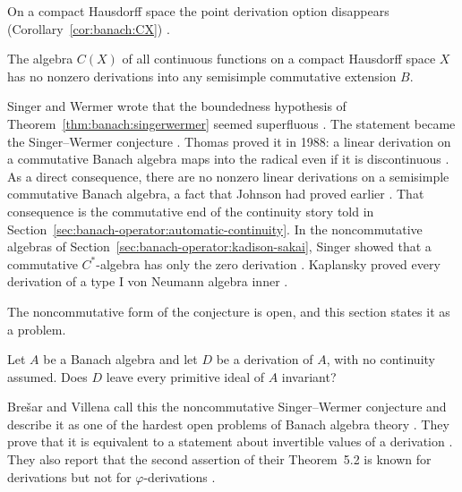 On a compact Hausdorff space the point derivation option disappears (Corollary~\ref{cor:banach:CX})
\cite[p.~264]{SingerWermer1955}.\begin{corollary}\label{cor:banach:CX}
The algebra $C(X)$ of all continuous functions on a compact Hausdorff space
$X$ has no nonzero derivations into any semisimple commutative extension
$B$.
\end{corollary}

Singer and Wermer wrote that the boundedness hypothesis of
Theorem~\ref{thm:banach:singerwermer} seemed superfluous
\cite[p.~260]{SingerWermer1955}. The statement became the
Singer--Wermer conjecture \cite[p.~523]{MiuraHirasawaTakahasi2006}.
Thomas proved it in 1988: a
linear derivation on a commutative Banach algebra maps into the radical
even if it is discontinuous \cite[pp.~435--460]{Thomas1988Image}. As a
direct consequence, there are no nonzero linear derivations on a semisimple
commutative Banach algebra, a fact that Johnson had proved earlier
\cite[p.~523]{MiuraHirasawaTakahasi2006}. That consequence is the
commutative end of the continuity story told in
Section~\ref{sec:banach-operator:automatic-continuity}. In the
noncommutative algebras of
Section~\ref{sec:banach-operator:kadison-sakai}, Singer showed that a commutative
$C^*$-algebra has only the zero derivation
\cite[pp.~260--261]{SingerWermer1955}. Kaplansky proved every
derivation of a type I von Neumann algebra inner
\cite[p.~280]{Kadison1966}.

The noncommutative form of the conjecture is open, and this section states it
as a problem. %

\begin{problem}\label{prob:open:sw}
Let $A$ be a Banach algebra and let $D$ be a derivation of $A$, with no
continuity assumed.
Does $D$ leave every primitive ideal of $A$ invariant?
\end{problem}

Bre\v{s}ar and Villena call this the noncommutative Singer--Wermer conjecture
and describe it as one of the hardest open problems of Banach algebra theory
\cite[p.~710]{BresarVillena2002}. They prove that it is equivalent to a
statement about invertible values of a derivation
\cite[Theorem~5.2, p.~719]{BresarVillena2002}. They also report that the second
assertion of their Theorem~5.2 is known for derivations but not for
$\varphi$-derivations \cite[Remark~5.3, p.~720]{BresarVillena2002}.

